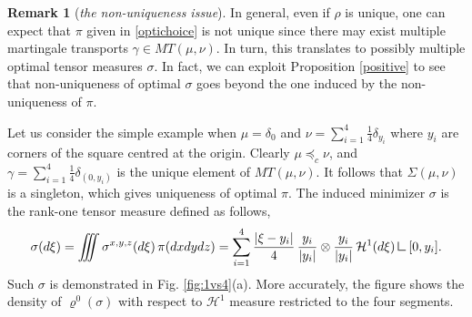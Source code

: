 \documentclass[11pt,letterpaper,reqno]{amsart}
\theoremstyle{definition}
\newtheorem{remark}[theorem]{Remark}
\numberwithin{equation}{section}
\newcommand{\abs}[1]{{\left \lvert #1 \right \rvert}}
\newcommand{\V}{{\mathcal{V}}}
\newcommand{\Ha}{\mathcal{H}}
\newcommand{\mres}{\mathbin{\vrule height 1.6ex depth 0pt width
		0.13ex\vrule height 0.13ex depth 0pt width 1.3ex}}
\begin{document}
{%

\begin{remark}[\emph{the non-uniqueness issue}] In general,  even if $\rho$ is unique, one can expect
that $\pi$ given in \eqref{optichoice} is not unique since there may exist multiple martingale transports  $\gamma\in MT(\mu,\nu)$.  In turn, this translates to possibly multiple  optimal tensor measures $\sigma$.
In fact, we can exploit Proposition \ref{positive} to see that non-uniqueness of optimal $\sigma$ goes beyond the one induced by the non-uniqueness of $\pi$.

 Let us consider the simple example when $\mu = \delta_0$ and $\nu = \sum_{i=1}^4 \frac{1}{4} \delta_{y_i}$ where $y_i$ are corners of the square centred at the origin. Clearly $\mu \preceq_c \nu$, and $\gamma =  \sum_{i=1}^4 \frac{1}{4} \delta_{(0,y_i)}$ is the unique element of $MT(\mu,\nu)$. It follows that $\Sigma(\mu,\nu)$ is a singleton, which gives uniqueness of optimal $\pi$. The induced minimizer $\sigma$  is the rank-one tensor measure defined as follows,
\begin{equation*}
	\sigma(d\xi) = \iiint \sigma^{x,y,z}(d\xi)\,\pi(dxdydz) = \sum_{i=1}^4   \frac{\abs{\xi-y_i}}{4} \, \frac{y_i}{\abs{y_i}} \otimes  \frac{y_i}{\abs{y_i}}  \, \Ha^1(d\xi) \mres[0,y_i].
\end{equation*}
Such $\sigma$ is demonstrated in Fig. \ref{fig:1vs4}(a). More accurately, the figure shows  the density of $\varrho^0(\sigma)$ with respect to $\Ha^1$ measure restricted to the four segments.


\end{remark}}
\end{document}

